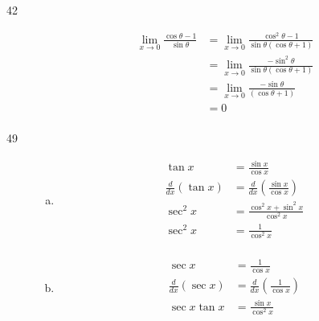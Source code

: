 \documentclass[letterpaper]{exam}
\begin{document}
\begin{description}
    \item[42] 
      \begin{align*}
        \lim_{x \to 0} \frac{\cos \theta - 1}{\sin \theta} 
          & = \lim_{x \to 0} \frac{\cos^2 \theta - 1}{\sin \theta (\cos \theta + 1)} \\
          & = \lim_{x \to 0} \frac{- \sin^2 \theta}{\sin \theta (\cos \theta + 1)} \\
          & = \lim_{x \to 0} \frac{- \sin \theta}{(\cos \theta + 1)} \\
          & = \boxed{ 0 } \\
      \end{align*}

    \item[49]
      \begin{enumerate}[(a)]
        \item 
          \begin{align*}
            \tan x                  & = \frac{\sin x}{\cos x} \\
            \frac{d}{dx} ( \tan x ) & = \frac{d}{dx} \left( \frac{\sin x}{\cos x} \right) \\
            \sec^2 x                & =  \frac{\cos^2 x + \sin^2 x}{\cos^2 x} \\
            \sec^2 x                & =  \frac{1}{\cos^2 x} \\
          \end{align*}

        \item
          \begin{align*}
            \sec x                  & = \frac{1}{\cos x} \\
            \frac{d}{dx} ( \sec x ) & = \frac{d}{dx} \left( \frac{1}{\cos x} \right) \\
            \sec x \tan x           & = \frac{\sin x}{\cos^2 x} \\
          \end{align*}


\end{enumerate}
\end{description}
\end{document}
